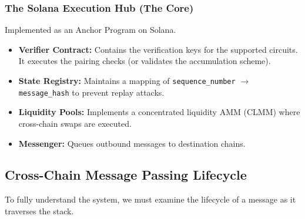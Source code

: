 \documentclass[11pt,a4paper]{article}
\begin{document}
\subsubsection{The Solana Execution Hub (The Core)}
Implemented as an Anchor Program on Solana.
\begin{itemize}
    \item \textbf{Verifier Contract:} Contains the verification keys for the supported circuits. It executes the pairing checks (or validates the accumulation scheme).
    \item \textbf{State Registry:} Maintains a mapping of \texttt{sequence\_number} $\rightarrow$ \texttt{message\_hash} to prevent replay attacks.
    \item \textbf{Liquidity Pools:} Implements a concentrated liquidity AMM (CLMM) where cross-chain swaps are executed.
    \item \textbf{Messenger:} Queues outbound messages to destination chains.
\end{itemize}

\subsection{Cross-Chain Message Passing Lifecycle}
To fully understand the system, we must examine the lifecycle of a message as it traverses the stack.
\end{document}
